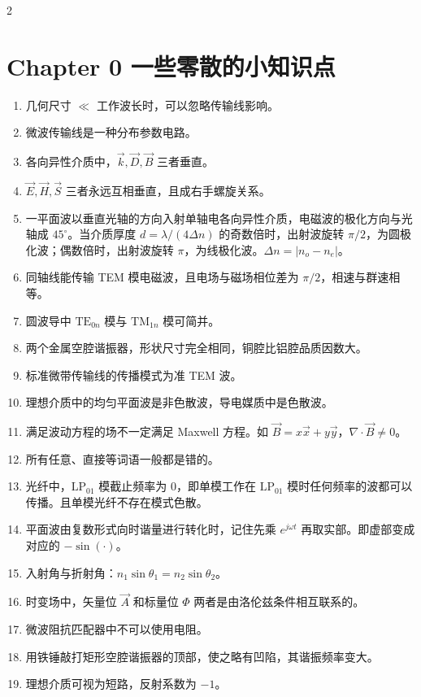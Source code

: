 \documentclass[10pt,a4paper,landscape]{article}
\begin{document}
\vspace{-1.2cm}

\begin{multicols}{2}

\section{Chapter 0 一些零散的小知识点}
\begin{enumerate}
    \item 几何尺寸 $\ll$ 工作波长时，可以忽略传输线影响。
    \item 微波传输线是一种分布参数电路。
    \item 各向异性介质中，$\vec{k}, \vec{D}, \vec{B}$ 三者垂直。
    \item $\vec{E}, \vec{H}, \vec{S}$ 三者永远互相垂直，且成右手螺旋关系。
    \item 一平面波以垂直光轴的方向入射单轴电各向异性介质，电磁波的极化方向与光轴成 $45^\circ$。当介质厚度 $d = \lambda / (4\Delta n)$ 的奇数倍时，出射波旋转 $\pi/2$，为圆极化波；偶数倍时，出射波旋转 $\pi$，为线极化波。$\Delta n = |n_o - n_e|$。
    \item 同轴线能传输 TEM 模电磁波，且电场与磁场相位差为 $\pi/2$，相速与群速相等。
    \item 圆波导中 $\text{TE}_{0n}$ 模与 $\text{TM}_{1n}$ 模可简并。
    \item 两个金属空腔谐振器，形状尺寸完全相同，铜腔比铝腔品质因数大。
    \item 标准微带传输线的传播模式为准 TEM 波。
    \item 理想介质中的均匀平面波是非色散波，导电媒质中是色散波。
    \item 满足波动方程的场不一定满足 Maxwell 方程。如 $\vec{B} = x\vec{x} + y\vec{y}$，$\nabla\cdot\vec{B} \neq 0$。
    \item 所有任意、直接等词语一般都是错的。
    \item 光纤中，$\text{LP}_{01}$ 模截止频率为 0，即单模工作在 $\text{LP}_{01}$ 模时任何频率的波都可以传播。且单模光纤不存在模式色散。
    \item 平面波由复数形式向时谐量进行转化时，记住先乘 $e^{j\omega t}$ 再取实部。即虚部变成对应的 $-\sin(\cdot)$。
    \item 入射角与折射角：$n_1 \sin\theta_1 = n_2 \sin\theta_2$。
    \item 时变场中，矢量位 $\vec{A}$ 和标量位 $\Phi$ 两者是由洛伦兹条件相互联系的。
    \item 微波阻抗匹配器中不可以使用电阻。
    \item 用铁锤敲打矩形空腔谐振器的顶部，使之略有凹陷，其谐振频率变大。
    \item 理想介质可视为短路，反射系数为 $-1$。
\end{enumerate}


\end{multicols}
\end{document}
